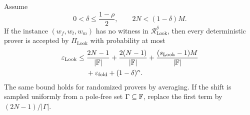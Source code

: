\begin{theorem}
\label{thm:lookup-soundness}
Assume
\begin{equation}
  0<\delta\le\frac{1-\rho}{2},
  \qquad
  2N<(1-\delta)M.
  \label{eq:lookup-parameters}
\end{equation}
If the instance $(w_f,w_t,w_m)$ has no witness in $\mathcal R^{\delta}_{\mathrm{Look}}$, then every deterministic prover is accepted by $\Pi_{\mathrm{Look}}$ with probability at most
\begin{equation}
\begin{split}
  \varepsilon_{\mathrm{Look}}
  \le{}&
  \frac{2N-1}{|\mathbb{F}|}
  +\frac{2(N-1)}{|\mathbb{F}|}
  +\frac{(s_{\mathrm{Look}}-1)M}{|\mathbb{F}|}
  \\
  &+\varepsilon_{\mathrm{fold}}
  +(1-\delta)^\kappa.
\end{split}
\label{eq:lookup-soundness-bound}
\end{equation}
The same bound holds for randomized provers by averaging.  If the shift is sampled uniformly from a pole-free set $\Gamma\subseteq\mathbb{F}$, replace the first term by $(2N-1)/|\Gamma|$.
\end{theorem}


